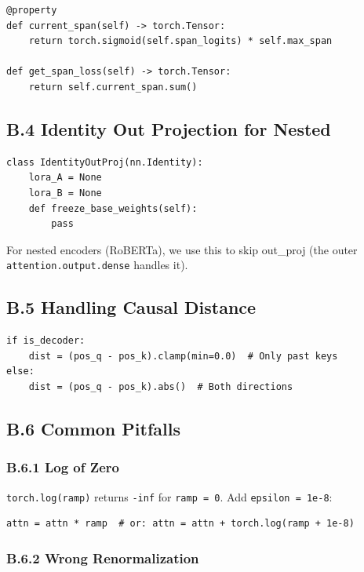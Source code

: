 \begin{lstlisting}
@property
def current_span(self) -> torch.Tensor:
    return torch.sigmoid(self.span_logits) * self.max_span

def get_span_loss(self) -> torch.Tensor:
    return self.current_span.sum()
\end{lstlisting}

\subsection{B.4 Identity Out Projection for Nested}

\begin{lstlisting}
class IdentityOutProj(nn.Identity):
    lora_A = None
    lora_B = None
    def freeze_base_weights(self):
        pass
\end{lstlisting}

For nested encoders (RoBERTa), we use this to skip out\_proj (the outer 
\texttt{attention.output.dense} handles it).

\subsection{B.5 Handling Causal Distance}

\begin{lstlisting}
if is_decoder:
    dist = (pos_q - pos_k).clamp(min=0.0)  # Only past keys
else:
    dist = (pos_q - pos_k).abs()  # Both directions
\end{lstlisting}

\subsection{B.6 Common Pitfalls}

\subsubsection{B.6.1 Log of Zero}

\texttt{torch.log(ramp)} returns \texttt{-inf} for \texttt{ramp = 0}. Add \texttt{epsilon = 1e-8}:
\begin{lstlisting}
attn = attn * ramp  # or: attn = attn + torch.log(ramp + 1e-8)
\end{lstlisting}

\subsubsection{B.6.2 Wrong Renormalization}

